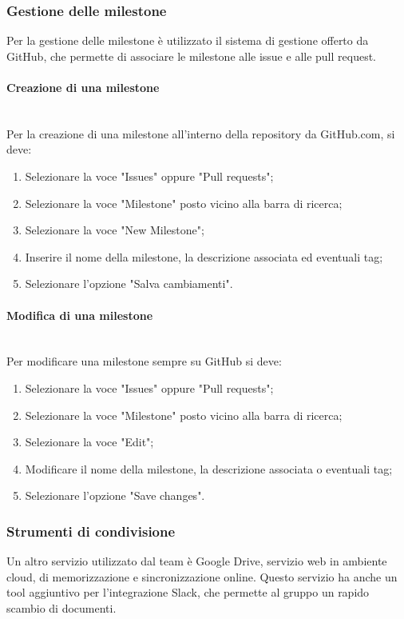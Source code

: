{\subsubsection{Gestione delle milestone}
Per la gestione delle {milestone} è utilizzato il sistema di gestione offerto da GitHub, che permette di associare le milestone alle issue e alle pull request.
\paragraph{Creazione di una milestone}\mbox{}\\
Per la creazione di una milestone all'interno della repository da GitHub.com, si deve:
\begin{enumerate}
\item Selezionare la voce "Issues" oppure "Pull requests";
\item Selezionare la voce "Milestone" posto vicino alla barra di ricerca;
\item Selezionare la voce "New Milestone";
\item Inserire il nome della milestone, la descrizione associata ed eventuali tag;
\item Selezionare l'opzione "Salva cambiamenti".
\end{enumerate}
\paragraph{Modifica di una milestone}\mbox{}\\
Per modificare una milestone sempre su GitHub si deve:
\begin{enumerate}
\item Selezionare la voce "Issues" oppure "Pull requests";
\item Selezionare la voce "Milestone" posto vicino alla barra di ricerca;
\item Selezionare la voce "Edit";
\item Modificare il nome della milestone, la descrizione associata o eventuali tag;
\item Selezionare l'opzione "Save changes".
\end{enumerate}

\subsubsection{Strumenti di condivisione}
Un altro servizio utilizzato dal team è Google Drive, servizio web in {ambiente cloud}, di memorizzazione e sincronizzazione online. Questo servizio ha anche un tool aggiuntivo per l'integrazione Slack, che permette al gruppo un rapido scambio di documenti.
}
